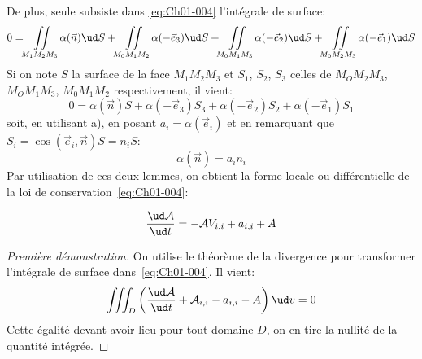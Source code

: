 De plus, seule subsiste dans \eqref{eq:Ch01-004} l'intégrale de surface:
\begin{equation*}
    0=\iint\limits_{M_1M_2M_3}\alpha(\vec{n}) \ud S+\iint\limits_{M_0M_1M_2}\alpha(-\vec{e}_3) \ud S+ \iint\limits_{M_0M_1M_3}\alpha(-\vec{e}_2) \ud S+\iint\limits_{M_0M_2M_3}\alpha(-\vec{e}_1) \ud S
\end{equation*}
Si on note $S$ la surface de la face $M_1M_2M_3$ et $S_1$, $S_2$, $S_3$ celles de $M_OM_2M_3$, $M_OM_1M_3$, $M_0M_1M_2$ respectivement, il vient:
\begin{equation*}
    0 = \alpha(\vec{n})S+\alpha(-\vec{e}_3)S_3+\alpha(-\vec{e}_2)S_2+\alpha(-\vec{e}_1)S_1
\end{equation*}
soit, en utilisant a), en posant $a_i=\alpha(\vec{e}_i)$ et en remarquant que $S_i=\cos(\vec{e}_i,\vec{n})S=n_iS$:
\begin{equation*}
    \alpha(\vec{n})=a_in_i
\end{equation*}
Par utilisation de ces deux lemmes, on obtient la forme locale ou différentielle de la loi de conservation~\eqref{eq:Ch01-004}:
\begin{thm}
    \begin{equation}
        \frac{\ud \mathcal{A}}{\ud t} = -\mathcal{A}V_{i,i} + a_{i,i} + A
        \label{eq:Ch01-008}
    \end{equation}
    \label{thm:Ch01-1}
\end{thm}
\begin{proof}[Première démonstration]
    On utilise le théorème de la divergence pour transformer l'intégrale de surface dans~\eqref{eq:Ch01-004}.
    Il vient:
    \begin{equation*}
        \iiint_D\left(\frac{\ud \mathcal{A}}{\ud t}+\mathcal{A}_{i,i}-a_{i,i}-A\right)\ud v=0
    \end{equation*}
    Cette égalité devant avoir lieu pour tout domaine $D$, on en tire la nullité de la quantité intégrée.
\end{proof}

